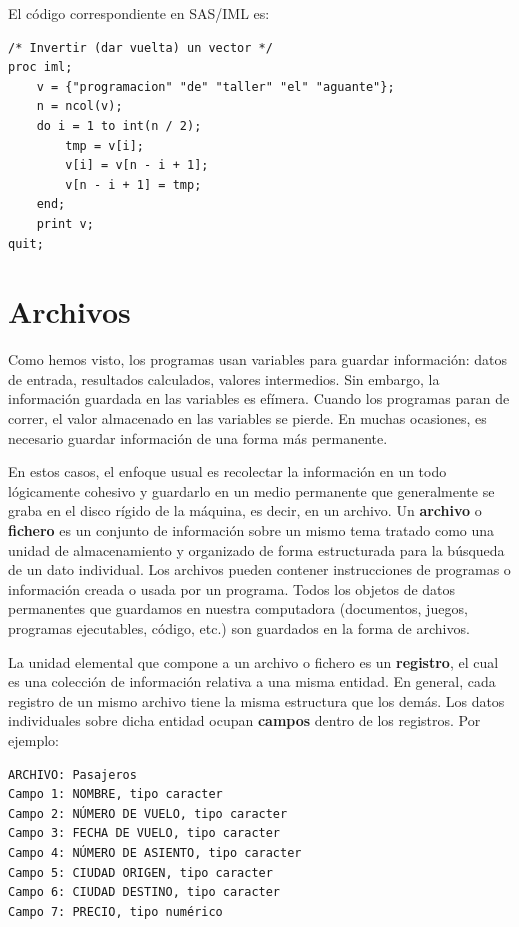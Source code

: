 \documentclass[]{book}
\begin{document}
El código correspondiente en SAS/IML es:

\begin{verbatim}
/* Invertir (dar vuelta) un vector */
proc iml;
    v = {"programacion" "de" "taller" "el" "aguante"};
    n = ncol(v);
    do i = 1 to int(n / 2);
        tmp = v[i];
        v[i] = v[n - i + 1];
        v[n - i + 1] = tmp;
    end;
    print v;
quit;
\end{verbatim}

\hypertarget{archivos}{%
\chapter{Archivos}\label{archivos}}

Como hemos visto, los programas usan variables para guardar información: datos de entrada, resultados calculados, valores intermedios. Sin embargo, la información guardada en las variables es efímera. Cuando los programas paran de correr, el valor almacenado en las variables se pierde. En muchas ocasiones, es necesario guardar información de una forma más permanente.

En estos casos, el enfoque usual es recolectar la información en un todo lógicamente cohesivo y guardarlo en un medio permanente que generalmente se graba en el disco rígido de la máquina, es decir, en un archivo. Un \textbf{archivo} o \textbf{fichero} es un conjunto de información sobre un mismo tema tratado como una unidad de almacenamiento y organizado de forma estructurada para la búsqueda de un dato individual. Los archivos pueden contener instrucciones de programas o información creada o usada por un programa. Todos los objetos de datos permanentes que guardamos en nuestra computadora (documentos, juegos, programas ejecutables, código, etc.) son guardados en la forma de archivos.

La unidad elemental que compone a un archivo o fichero es un \textbf{registro}, el cual es una colección de información relativa a una misma entidad. En general, cada registro de un mismo archivo tiene la misma estructura que los demás. Los datos individuales sobre dicha entidad ocupan \textbf{campos} dentro de los registros. Por ejemplo:

\begin{verbatim}
ARCHIVO: Pasajeros
Campo 1: NOMBRE, tipo caracter
Campo 2: NÚMERO DE VUELO, tipo caracter
Campo 3: FECHA DE VUELO, tipo caracter
Campo 4: NÚMERO DE ASIENTO, tipo caracter
Campo 5: CIUDAD ORIGEN, tipo caracter
Campo 6: CIUDAD DESTINO, tipo caracter
Campo 7: PRECIO, tipo numérico
\end{verbatim}
\end{document}
